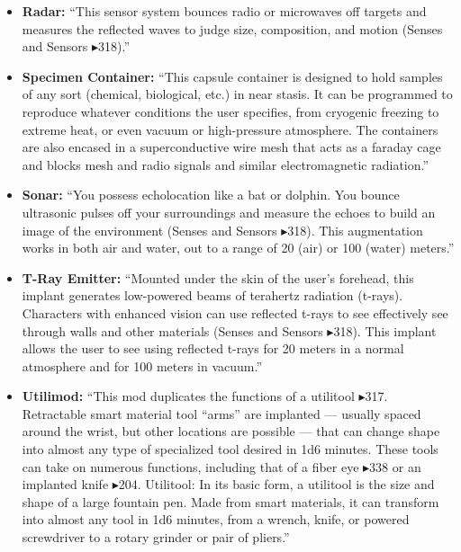 \begin{itemize}
    \item \textbf{Radar:} “This sensor system bounces radio or microwaves off targets and measures the reflected waves to judge size, composition, and motion (Senses and Sensors $\blacktriangleright$318).” \citep[pg. 318]{ep2e_1.1_2019}

    \item \textbf{Specimen Container:} “This capsule container is designed to hold samples of any sort (chemical, biological, etc.) in near stasis. It can be programmed to reproduce whatever conditions the user specifies, from cryogenic freezing to extreme heat, or even vacuum or high-pressure atmosphere. The containers are also encased in a superconductive wire mesh that acts as a faraday cage and blocks mesh and radio signals and similar electromagnetic radiation.” \citep[pg. 340]{ep2e_1.1_2019}

    \item \textbf{Sonar:} “You possess echolocation like a bat or dolphin. You bounce ultrasonic pulses off your surroundings and measure the echoes to build an image of the environment (Senses and Sensors $\blacktriangleright$318). This augmentation works in both air and water, out to a range of 20 (air) or 100 (water) meters.” \citep[pg. 318]{ep2e_1.1_2019}

    \item \textbf{T-Ray Emitter:} “Mounted under the skin of the user’s forehead, this implant generates low-powered beams of terahertz radiation (t-rays). Characters with enhanced vision can use reflected t-rays to see effectively see through walls and other materials (Senses and Sensors $\blacktriangleright$318). This implant allows the user to see using reflected t-rays for 20 meters in a normal atmosphere and for 100 meters in vacuum.” \citep[pg. 318]{ep2e_1.1_2019}

    \item \textbf{Utilimod:} “This mod duplicates the functions of a utilitool $\blacktriangleright$317. Retractable smart material tool “arms” are implanted — usually spaced around the wrist, but other locations are possible — that can change shape into almost any type of specialized tool desired in 1d6 minutes. These tools can take on numerous functions, including that of a fiber eye $\blacktriangleright$338 or an implanted knife $\blacktriangleright$204. Utilitool: In its basic form, a utilitool is the size and shape of a large fountain pen. Made from smart materials, it can transform into almost any tool in 1d6 minutes, from a wrench, knife, or powered screwdriver to a rotary grinder or pair of pliers.” \citep[pg. 325]{ep2e_1.1_2019}
\end{itemize}

